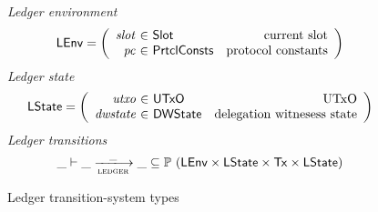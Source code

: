 \documentclass[11pt,a4paper]{article}
\newcommand{\Tx}{\type{Tx}}
\newcommand{\UTxO}{\type{UTxO}}
\newcommand{\PrtclConsts}{\type{PrtclConsts}}
\newcommand{\Slot}{\type{Slot}}
\newcommand{\DWState}{\type{DWState}}
\newcommand{\LEnv}{\type{LEnv}}
\newcommand{\LState}{\type{LState}}
\theoremstyle{definition}
\theoremstyle{definition}
\begin{document}
\begin{figure}
  \emph{Ledger environment}
  \begin{equation*}
    \LEnv =
    \left(
      \begin{array}{r@{~\in~}lr}
        \var{slot} & \Slot & \text{current slot}\\
        \var{pc} & \PrtclConsts & \text{protocol constants}\\
      \end{array}
    \right)
  \end{equation*}
  \emph{Ledger state}
  \begin{equation*}
    \LState =
    \left(
      \begin{array}{r@{~\in~}lr}
        \var{utxo} & \UTxO & \text{UTxO}\\
        \var{dwstate} & \DWState & \text{delegation witnesess state}\\
      \end{array}
    \right)
  \end{equation*}
  \emph{Ledger transitions}
  \begin{equation*}
    \_ \vdash
    \var{\_} \trans{ledger}{\_} \var{\_}
    \subseteq \powerset (\LEnv \times \LState \times \Tx \times \LState)
  \end{equation*}
  \caption{Ledger transition-system types}
  \label{fig:ts-types:ledger}
\end{figure}
\end{document}
